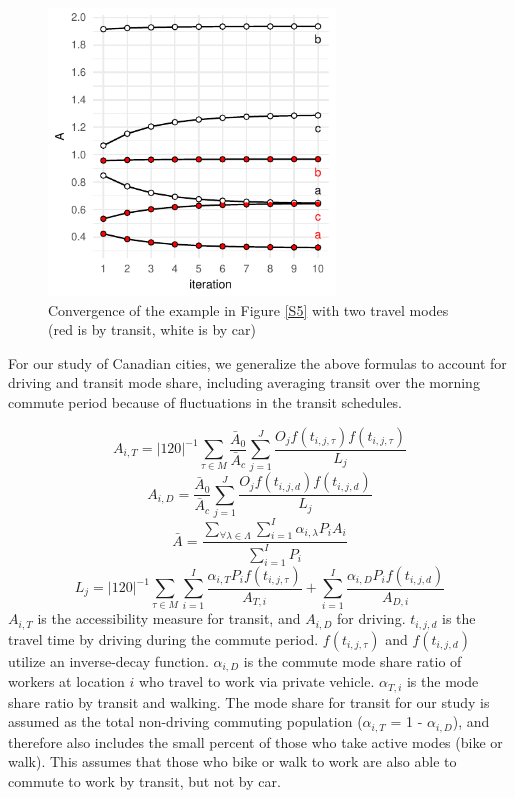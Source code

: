 \documentclass[11 pt, letterpaper]{article}
\begin{document}
{\begin{figure}[H]
	\caption{Convergence of the example in Figure \ref{S5} with two travel modes (red is by transit, white is by car)} 
	\label{S5c}
	\centerline{\includegraphics[width=3in]{figures/convg/conRS5.pdf}}
	\vspace{2mm}
\end{figure}


For our study of Canadian cities, we generalize the above formulas to account for driving and transit mode share, including averaging transit over the morning commute period because of fluctuations in the transit schedules.

\begin{equation}
A_{i,T} = |120|^{-1} \sum_{\tau \in M} \frac{\bar A_0}{\bar A_c} \sum_{j = 1}^{J} \frac{ O_j f(t_{i,j,\tau}) f(t_{i,j,\tau})}{L_{j}}
\end{equation}
\begin{equation}
A_{i,D} = \frac{\bar A_0}{\bar A_c} \sum_{j = 1}^{J} \frac{ O_j f(t_{i,j,d})  f(t_{i,j,d})}{L_{j}}
\end{equation}
\begin{equation}
\bar A = \frac{\sum_{\forall \lambda \in \Lambda} \sum_{i=1}^{I} \alpha_{i,\lambda} P_i A_i}{\sum_{i=1}^{I} P_i}
\end{equation}
\begin{equation}
L_j = |120|^{-1} \sum_{\tau \in M} \sum_{i = 1}^{I} \frac{ \alpha_{i,T} P_{i} f(t_{i,j,\tau})}{A_{T,i}}
+ \sum_{i = 1}^{I} \frac{\alpha_{i,D} P_{i} f(t_{i,j,d}) }{A_{D,i}}
\end{equation}
$A_{i,T}$ is the accessibility measure for transit, and $A_{i,D}$ for driving. $t_{i,j,d}$ is the travel time by driving during the commute period. $f(t_{i,j,\tau})$ and $f(t_{i,j,d})$ utilize an inverse-decay function. $\alpha_{i,D}$ is the commute mode share ratio of workers at location $i$ who travel to work via private vehicle. $\alpha_{T,i}$ is the mode share ratio by transit and walking. The mode share for transit for our study is assumed as the total non-driving commuting population ($\alpha_{i,T}$ = 1 - $\alpha_{i,D}$), and therefore also includes the small percent of those who take active modes (bike or walk). This assumes that those who bike or walk to work are also able to commute to work by transit, but not by car. 

}
\end{document}
